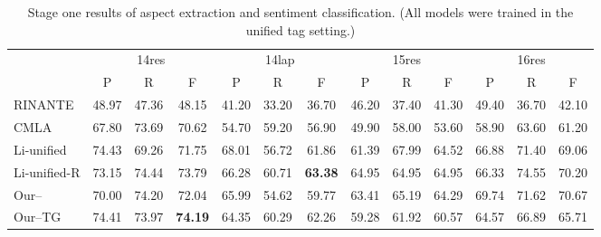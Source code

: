 \documentclass[letterpaper]{article} \usepackage{aaai20}  \usepackage{times}  \usepackage{helvet} \usepackage{courier}  \usepackage[hyphens]{url}  \usepackage{graphicx} \urlstyle{rm} \def\UrlFont{\rm}  \usepackage{graphicx}  \frenchspacing  \setlength{\pdfpagewidth}{8.5in}  \setlength{\pdfpageheight}{11in}
\begin{document}
\begin{table*}[t]
\caption{Stage one results of aspect extraction and sentiment classification.  (All models were trained in the unified tag setting.) }
\label{tab:stage1_ts}
\centering
\begin{small}
\begin{tabular}{l|ccc|ccc|ccc|ccc}
\hline
               & \multicolumn{3}{c|}{14res}                       & \multicolumn{3}{c|}{14lap}                       & \multicolumn{3}{c|}{15res}                       & \multicolumn{3}{c}{16res}                        \\ \cline{2-13} 
                                   & P              & R              & F              & P              & R              & F              & P              & R              & F              & P              & R              & F              \\ \hline
RINANTE                            & 48.97          & 47.36          & 48.15          & 41.20          & 33.20          & 36.70          & 46.20          & 37.40          & 41.30          & 49.40          & 36.70          & 42.10          \\
CMLA                               & 67.80              & 73.69              & 70.62              & 54.70              & 59.20              & 56.90              & 49.90              & 58.00              & 53.60              & 58.90              & 63.60              & 61.20              \\
Li-unified                         & 74.43          & 69.26          & 71.75          & 68.01 & 56.72          & 61.86          & 61.39          & 67.99 & 64.52          & 66.88          & 71.40          & 69.06          \\
Li-unified-R                       & 73.15          & 74.44          & 73.79          & 66.28          & 60.71          & \textbf{63.38} & 64.95          & 64.95          & 64.95          & 66.33          & 74.55 & 70.20          \\ \hline
Our-- & 70.00          & 74.20          & 72.04 & 65.99          & 54.62          & 59.77          & 63.41          & 65.19 & 64.29          & 69.74          & 71.62          & 70.67          \\
Our--TG                             & 74.41 & 73.97          & \textbf{74.19}          & 64.35          & 60.29          & 62.26          & 59.28          & 61.92          & 60.57          & 64.57          & 66.89          & 65.71          \\

\end{tabular}
\end{small}
\end{table*}
\end{document}
